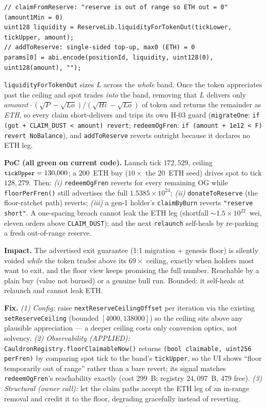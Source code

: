 \documentclass[10pt,a4paper]{article}
\newcommand{\code}[1]{\texttt{\small #1}}
\begin{document}
\begin{lstlisting}
// claimFromReserve: "reserve is out of range so ETH out = 0" (amount1Min = 0)
uint128 liquidity = ReserveLib.liquidityForTokenOut(tickLower, tickUpper, amount);
// addToReserve: single-sided top-up, max0 (ETH) = 0
params[0] = abi.encode(positionId, liquidity, uint128(0), uint128(amount), "");
\end{lstlisting}

\code{liquidityForTokenOut} sizes $L$ across the \emph{whole} band. Once the token
appreciates past the ceiling and spot trades \emph{into} the band, removing that $L$
delivers only $\textit{amount}\cdot(\sqrt P-\sqrt{Lo})/(\sqrt{Hi}-\sqrt{Lo})$ of
token and returns the remainder as \emph{ETH}, so every claim short-delivers and
trips its own H-03 guard (\code{migrateOne}: \code{if (got + CLAIM\_DUST < amount)
revert}; \code{redeemOgFren}: \code{if (amount + 1e12 < F) revert NoBalance}), and
\code{addToReserve} reverts outright because it declares no ETH leg.

\textbf{PoC (all green on current code).} Launch tick $172{,}529$, ceiling
$\code{tickUpper}=130{,}000$; a $200$~ETH buy ($10\times$ the $20$~ETH seed) drives
spot to tick $128{,}279$. Then: \emph{(i)} \code{redeemOgFren} reverts for every
remaining OG while \code{floorPerFren()} still advertises the full
$1.5385\times10^{24}$; \emph{(ii)} \code{donateToReserve} (the floor-ratchet path)
reverts; \emph{(iii)} a gen-1 holder's \code{claimByBurn} reverts \code{"reserve
short"}. A one-spacing breach cannot leak the ETH leg (shortfall $\sim1.5\times
10^{22}$~wei, eleven orders above \code{CLAIM\_DUST}); and the next \code{relaunch}
self-heals by re-parking a fresh out-of-range reserve.

\textbf{Impact.} The advertised exit guarantee (1:1 migration + genesis floor) is
silently voided \emph{while} the token trades above its $69\times$ ceiling, exactly
when holders most want to exit, and the floor view keeps promising the full number.
Reachable by a plain buy (value not burned) or a genuine bull run. Bounded: it
self-heals at relaunch and cannot leak ETH.

\textbf{Fix.} \emph{(1) Config:} raise \code{nextReserveCeilingOffset} per iteration
via the existing \code{setReserveCeiling} (bounded $[4000,138000]$) so the ceiling
sits above any plausible appreciation --- a deeper ceiling costs only conversion
optics, not solvency. \emph{(2) Observability (APPLIED):}
\code{CauldronRegistry.floorClaimableNow()} returns \code{(bool claimable, uint256
perFren)} by comparing spot tick to the band's \code{tickUpper}, so the UI shows
``floor temporarily out of range'' rather than a bare revert; its signal matches
\code{redeemOgFren}'s reachability exactly (cost 299~B; registry $24{,}097$~B, 479
free). \emph{(3) Structural (owner call):} let the claim paths accept the ETH leg of
an in-range removal and credit it to the floor, degrading gracefully instead of
reverting.
\end{document}
